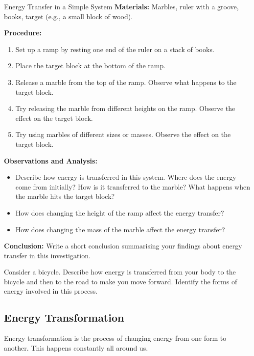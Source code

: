 \begin{investigation}{Energy Transfer in a Simple System}
\textbf{Materials:} Marbles, ruler with a groove, books, target (e.g., a small block of wood).

\textbf{Procedure:}
\begin{enumerate}
    \item Set up a ramp by resting one end of the ruler on a stack of books.
    \item Place the target block at the bottom of the ramp.
    \item Release a marble from the top of the ramp. Observe what happens to the target block.
    \item Try releasing the marble from different heights on the ramp. Observe the effect on the target block.
    \item Try using marbles of different sizes or masses. Observe the effect on the target block.
\end{enumerate}

\textbf{Observations and Analysis:}
\begin{itemize}
    \item Describe how energy is transferred in this system. Where does the energy come from initially? How is it transferred to the marble? What happens when the marble hits the target block?
    \item How does changing the height of the ramp affect the energy transfer?
    \item How does changing the mass of the marble affect the energy transfer?
\end{itemize}

\textbf{Conclusion:}
Write a short conclusion summarising your findings about energy transfer in this investigation.
\end{investigation}

\begin{stopandthink}
Consider a bicycle.  Describe how energy is transferred from your body to the bicycle and then to the road to make you move forward. Identify the forms of energy involved in this process.
\end{stopandthink}


\subsection{Energy Transformation}

Energy transformation is the process of changing energy from one form to another.  This happens constantly all around us.

